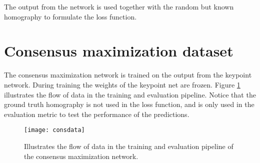 The output from the network is used together with the random but known homography to formulate the loss function.

\section{Consensus maximization dataset}

The consensus maximization network is trained on the output from the keypoint network. During training the weights of the keypoint net are frozen. Figure \ref{fig:consdata} illustrates the flow of data in the training and evaluation pipeline. Notice that the ground truth homography is not used in the loss function, and is only used in the evaluation metric to test the performance of the predictions.

\begin{figure}[H]
	\centering
	\texttt{[image: consdata]}
	\caption{Illustrates the flow of data in the training and evaluation pipeline of the consensus maximization network.}
	\label{fig:consdata}
\end{figure}
